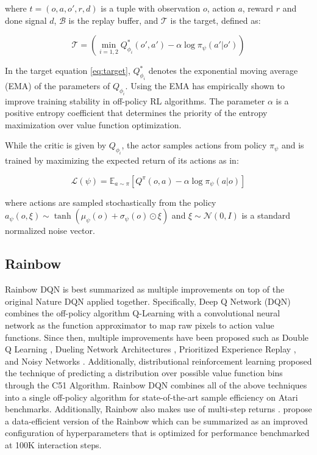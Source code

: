where $t = (o,a,o',r,d)$ is a tuple with observation $o$, action $a$, reward $r$ and done signal $d$, $\mathcal{B}$ is the replay buffer, and $\mathcal T$ is the target, defined as:

\begin{equation}\label{eq:target}
   \mathcal{T}  = \left (\min_{i=1,2} Q^{*}_{\phi_i} (o',a') - \alpha \log \pi_\psi(a'|o')\right )
\end{equation}

In the target equation \eqref{eq:target}, $Q^{*}_{\phi_i}$ denotes the exponential moving average (EMA) of the parameters of $Q_{\phi_i}$. Using the EMA has empirically shown to improve training stability in off-policy RL algorithms. The parameter $\alpha$ is a positive entropy coefficient that determines the priority of the entropy maximization over value function optimization. 

While the critic is given by $Q_{\phi_{i}}$, the actor samples actions from policy $\pi_\psi$ and is trained by maximizing the expected return of its actions as in:

\begin{equation}\label{eq:actorloss}
   \mathcal L (\psi) = \mathbb{E}_{a \sim \pi} \left [ Q^\pi (o,a) - \alpha \log \pi_\psi (a|o) \right ]
\end{equation}

where actions are sampled stochastically from the policy $
   a_\psi (o,\xi) \sim \tanh \left (\mu_\psi (o) + \sigma_\psi (o) \odot \xi \right )$ and $\xi \sim \mathcal N (0,I)$ is a standard normalized noise vector. 

\subsection{Rainbow}
Rainbow DQN \cite{hessel2017rainbow} is best summarized as multiple improvements on top of the original Nature DQN \cite{mnih2015human} applied together. Specifically, Deep Q Network (DQN) \cite{mnih2015human} combines the off-policy algorithm Q-Learning with a convolutional neural network as the function approximator to map raw pixels to action value functions. Since then, multiple improvements have been proposed such as Double Q Learning \cite{van2016deep}, Dueling Network Architectures \cite{wang2015dueling}, Prioritized Experience Replay \cite{schaul2015prioritized}, and Noisy Networks \cite{fortunato2017noisy}. Additionally, distributional reinforcement learning \cite{bellemare2017distributional} proposed the technique of predicting a distribution over possible value function bins through the C51 Algorithm. Rainbow DQN combines all of the above techniques into a single off-policy algorithm for state-of-the-art sample efficiency on Atari benchmarks. Additionally, Rainbow also makes use of multi-step returns \cite{sutton1998introduction}. \citet{van2019use} propose a data-efficient version of the Rainbow which can be summarized as an improved configuration of hyperparameters that is optimized for performance benchmarked at 100K interaction steps.


